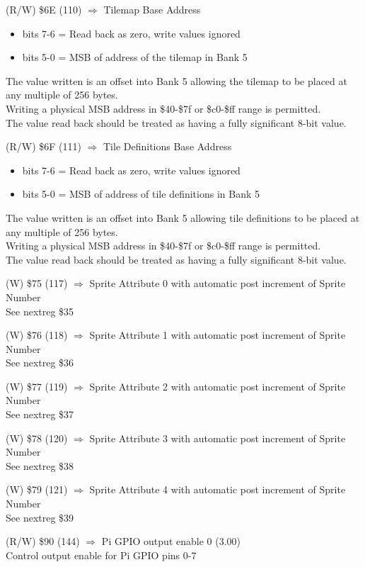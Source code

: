 (R/W) \$6E (110) $\Rightarrow$ Tilemap Base Address
\begin{itemize}
\item[] bits 7-6 = Read back as zero, write values ignored
\item[] bits 5-0 = MSB of address of the tilemap in Bank 5
\end{itemize}
The value written is an offset into Bank 5 allowing the tilemap to be
placed at any multiple of 256 bytes.\\
Writing a physical MSB address in \$40-\$7f or \$c0-\$ff range is
permitted.\\
The value read back should be treated as having a fully significant
8-bit value.

(R/W) \$6F (111) $\Rightarrow$ Tile Definitions Base Address
\begin{itemize}
\item[] bits 7-6 = Read back as zero, write values ignored
\item[] bits 5-0 = MSB of address of tile definitions in Bank 5
\end{itemize}
The value written is an offset into Bank 5 allowing tile definitions
to be placed at any multiple of 256 bytes.\\
Writing a physical MSB address in \$40-\$7f or \$c0-\$ff range is
permitted.\\
The value read back should be treated as having a fully significant
8-bit value.

(W) \$75 (117) $\Rightarrow$ Sprite Attribute 0 with automatic post
increment of Sprite Number\\
See nextreg \$35

(W) \$76 (118) $\Rightarrow$ Sprite Attribute 1 with automatic post
increment of Sprite Number\\
See nextreg \$36

(W) \$77 (119) $\Rightarrow$ Sprite Attribute 2 with automatic post
increment of Sprite Number\\
See nextreg \$37

(W) \$78 (120) $\Rightarrow$ Sprite Attribute 3 with automatic post
increment of Sprite Number\\
See nextreg \$38

(W) \$79 (121) $\Rightarrow$ Sprite Attribute 4 with automatic post
increment of Sprite Number\\
See nextreg \$39

(R/W) \$90 (144) $\Rightarrow$ Pi GPIO output enable 0 (3.00)\\
Control output enable for Pi GPIO pins 0-7

